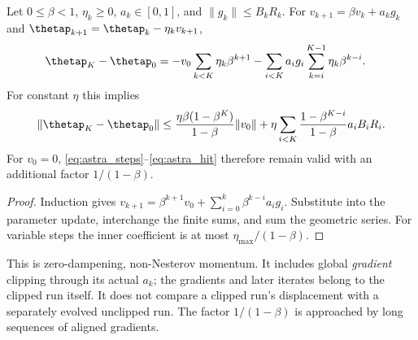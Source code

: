 \begin{lemma}
\label{lem:astra_momentum}
Let $0\le\beta<1$, $\eta_k\ge0$, $a_k\in[0,1]$, and
$\|g_k\|\le B_kR_k$. For
$v_{k+1}=\beta v_k+a_kg_k$ and
$\thetap_{k+1}=\thetap_k-\eta_kv_{k+1}$,
\begin{align}
 \thetap_K-\thetap_0
 &=-v_0\sum_{k<K}\eta_k\beta^{k+1}
   -\sum_{i<K}a_ig_i\sum_{k=i}^{K-1}\eta_k\beta^{k-i}.
 \label{eq:astra_momentum_exact}
\end{align}
For constant $\eta$ this implies
\begin{equation}\label{eq:astra_momentum}
 \|\thetap_K-\thetap_0\|\le
 \frac{\eta\beta(1-\beta^K)}{1-\beta}\|v_0\|
 +\eta\sum_{i<K}\frac{1-\beta^{K-i}}{1-\beta}a_iB_iR_i.
\end{equation}
For $v_0=0$, \eqref{eq:astra_steps}--\eqref{eq:astra_hit} therefore
remain valid with an additional factor $1/(1-\beta)$.
\end{lemma}
\begin{proof}
Induction gives $v_{k+1}=\beta^{k+1}v_0+
\sum_{i=0}^k\beta^{k-i}a_ig_i$. Substitute into the parameter update,
interchange the finite sums, and sum the geometric series. For variable
steps the inner coefficient is at most $\eta_{\max}/(1-\beta)$.
\end{proof}
\begin{remark}
This is zero-dampening, non-Nesterov momentum. It includes global
\emph{gradient} clipping through its actual $a_k$; the gradients and
later iterates belong to the clipped run itself. It does not compare
a clipped run's displacement with a separately evolved unclipped run.
The factor $1/(1-\beta)$ is approached by long sequences of aligned gradients.
\end{remark}

